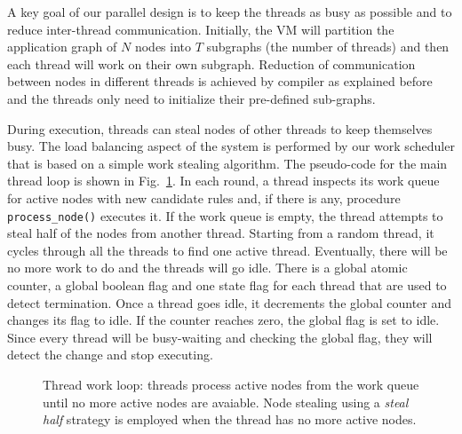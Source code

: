 A key goal of our parallel design is to keep the threads as busy as possible and
to reduce inter-thread communication. Initially, the VM will partition the
application graph of $N$ nodes into $T$ subgraphs (the number of threads) and
then each thread will work on their own subgraph. Reduction of communication
between nodes in different threads is achieved by compiler as explained before
and the threads only need to initialize their pre-defined sub-graphs.

During execution, threads can steal nodes of other threads to keep themselves
busy. The load balancing aspect of the system is performed by our work scheduler
that is based on a simple work stealing algorithm. The pseudo-code for the main
thread loop is shown in Fig.~\ref{alg:thread_work_loop}. In each round, a thread
inspects its work queue for active nodes with new candidate rules and, if there
is any, procedure \texttt{process\_node()} executes it. If the work queue is
empty, the thread attempts to steal half of the nodes from another thread.
Starting from a random thread, it cycles through all the threads to find one
active thread. Eventually, there will be no more work to do and the threads will
go idle. There is a global atomic counter, a global boolean flag and one state
flag for each thread that are used to detect termination. Once a thread goes
idle, it decrements the global counter and changes its flag to idle. If the
counter reaches zero, the global flag is set to idle. Since every thread will be
busy-waiting and checking the global flag, they will detect the change and stop
executing.

\begin{figure}
\begin{algorithm}[H]
\end{algorithm}
\caption{Thread work loop: threads process active nodes from the work queue
   until no more active nodes are avaiable. Node stealing using a \emph{steal
      half} strategy is employed when the thread has no more active nodes.}
 \label{alg:thread_work_loop}
\end{figure}

